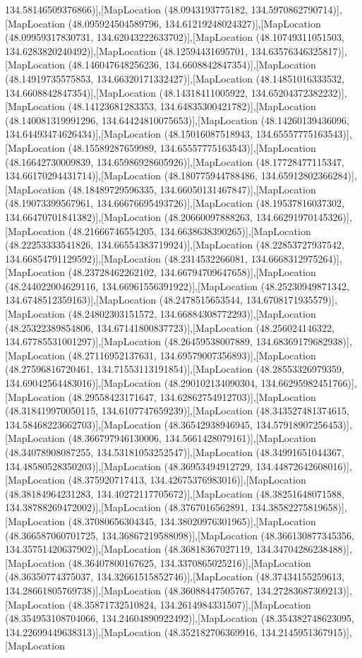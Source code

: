 134.58146509376866)],[MapLocation (48.0943193775182, 134.5970862790714)],[MapLocation (48.095924504589796, 134.61219248024327)],[MapLocation (48.09959317830731, 134.62043222633702)],[MapLocation (48.10749311051503, 134.6283820240492)],[MapLocation (48.12594431695701, 134.63576346325817)],[MapLocation (48.146047648256236, 134.6608842847354)],[MapLocation (48.14919735575853, 134.66320171332427)],[MapLocation (48.14851016333532, 134.6608842847354)],[MapLocation (48.14318411005922, 134.65204372382232)],[MapLocation (48.14123681283353, 134.64835300421782)],[MapLocation (48.140081319991296, 134.64424810075653)],[MapLocation (48.14260139436096, 134.64493474626434)],[MapLocation (48.15016087518943, 134.65557775163543)],[MapLocation (48.15589287659989, 134.65557775163543)],[MapLocation (48.16642730009839, 134.65986928605926)],[MapLocation (48.17728477115347, 134.66170294431714)],[MapLocation (48.180775944788486, 134.65912802366284)],[MapLocation (48.18489729596335, 134.66050131467847)],[MapLocation (48.19073399567961, 134.66676695493726)],[MapLocation (48.19537816037302, 134.66470701841382)],[MapLocation (48.20660097888263, 134.66291970145326)],[MapLocation (48.21666746554205, 134.6638638390265)],[MapLocation (48.22253333541826, 134.66554383719924)],[MapLocation (48.22853727937542, 134.66854791129592)],[MapLocation (48.2314532266081, 134.6668312975264)],[MapLocation (48.23728462262102, 134.66794709647658)],[MapLocation (48.244022004629116, 134.66961556391922)],[MapLocation (48.25230949871342, 134.6748512359163)],[MapLocation (48.2478515653544, 134.6708171935579)],[MapLocation (48.24802303151572, 134.66884308772293)],[MapLocation (48.25322389854806, 134.67141800837723)],[MapLocation (48.256024146322, 134.67785531001297)],[MapLocation (48.26459538007889, 134.68369179682938)],[MapLocation (48.27116952137631, 134.69579007356893)],[MapLocation (48.27596816720461, 134.71553113191854)],[MapLocation (48.28553326979359, 134.69042564483016)],[MapLocation (48.290102134090304, 134.66295982451766)],[MapLocation (48.29558423171647, 134.62862754912703)],[MapLocation (48.318419970050115, 134.6107747659239)],[MapLocation (48.343527481374615, 134.58468223662703)],[MapLocation (48.36542938946945, 134.57918907256453)],[MapLocation (48.366797946130006, 134.5661428079161)],[MapLocation (48.34078908087255, 134.53181053252547)],[MapLocation (48.34991651044367, 134.48580528350203)],[MapLocation (48.36953494912729, 134.44872642608016)],[MapLocation (48.375920717413, 134.42675376983016)],[MapLocation (48.38184964231283, 134.40272117705672)],[MapLocation (48.38251648071588, 134.38788269472002)],[MapLocation (48.3767016562891, 134.38582275819658)],[MapLocation (48.37080656304345, 134.38020976301965)],[MapLocation (48.366587060701725, 134.36867219588098)],[MapLocation (48.366130877345356, 134.35751420637902)],[MapLocation (48.36818367027119, 134.34704286238488)],[MapLocation (48.36407800167625, 134.3370865025216)],[MapLocation (48.36350774375037, 134.32661515852746)],[MapLocation (48.37434155259613, 134.28661805769738)],[MapLocation (48.36088447505767, 134.27283687309213)],[MapLocation (48.35871732510824, 134.2614984331507)],[MapLocation (48.354953108704066, 134.24604890922492)],[MapLocation (48.354382748623095, 134.22699449638313)],[MapLocation (48.352182706369916, 134.2145951367915)],[MapLocation 